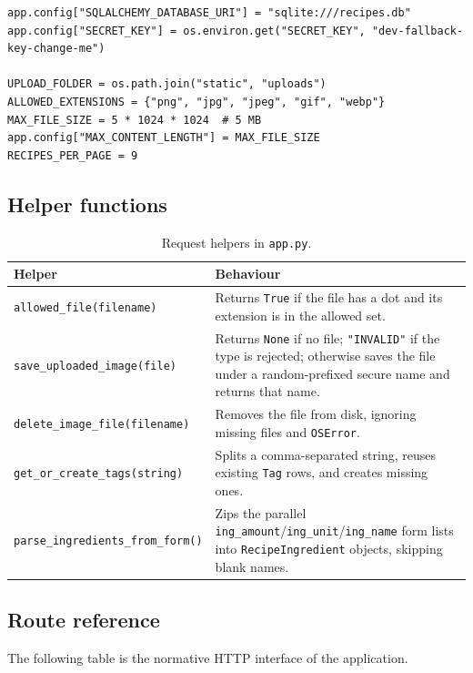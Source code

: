 \documentclass[11pt,a4paper]{article}
\newcommand{\code}[1]{\texttt{#1}}
\begin{document}
\begin{lstlisting}[caption={Configuration constants}]
app.config["SQLALCHEMY_DATABASE_URI"] = "sqlite:///recipes.db"
app.config["SECRET_KEY"] = os.environ.get("SECRET_KEY", "dev-fallback-key-change-me")

UPLOAD_FOLDER = os.path.join("static", "uploads")
ALLOWED_EXTENSIONS = {"png", "jpg", "jpeg", "gif", "webp"}
MAX_FILE_SIZE = 5 * 1024 * 1024  # 5 MB
app.config["MAX_CONTENT_LENGTH"] = MAX_FILE_SIZE
RECIPES_PER_PAGE = 9
\end{lstlisting}

\subsection{Helper functions}
\begin{table}[h]
\centering
\small
\begin{tabularx}{\textwidth}{@{}lX@{}}
\toprule
\textbf{Helper} & \textbf{Behaviour} \\
\midrule
\code{allowed\_file(filename)} & Returns \code{True} if the file has a dot and its extension is in the allowed set. \\
\code{save\_uploaded\_image(file)} & Returns \code{None} if no file; \code{"INVALID"} if the type is rejected; otherwise saves the file under a random-prefixed secure name and returns that name. \\
\code{delete\_image\_file(filename)} & Removes the file from disk, ignoring missing files and \code{OSError}. \\
\code{get\_or\_create\_tags(string)} & Splits a comma-separated string, reuses existing \code{Tag} rows, and creates missing ones. \\
\code{parse\_ingredients\_from\_form()} & Zips the parallel \code{ing\_amount}/\code{ing\_unit}/\code{ing\_name} form lists into \code{RecipeIngredient} objects, skipping blank names. \\
\bottomrule
\end{tabularx}
\caption{Request helpers in \code{app.py}.}
\end{table}

\subsection{Route reference}
The following table is the normative HTTP interface of the application.
\end{document}

